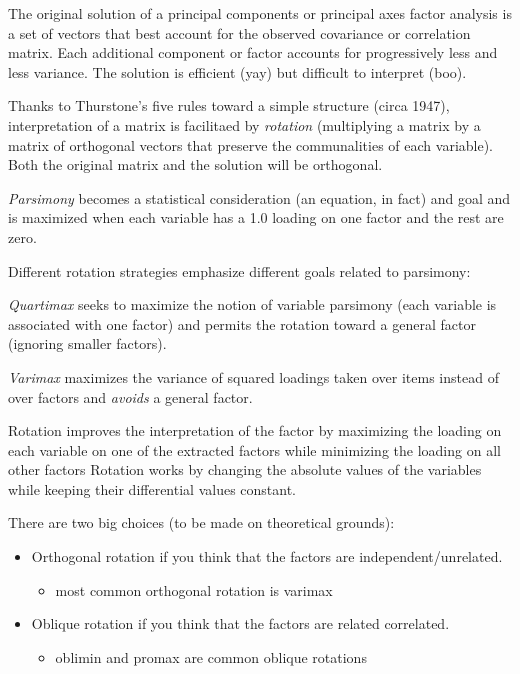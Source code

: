 \documentclass[
  english,
]{book}
\providecommand{\tightlist}{%
  \setlength{\itemsep}{0pt}\setlength{\parskip}{0pt}}
\begin{document}
The original solution of a principal components or principal axes factor analysis is a set of vectors that best account for the observed covariance or correlation matrix. Each additional component or factor accounts for progressively less and less variance. The solution is efficient (yay) but difficult to interpret (boo).

Thanks to Thurstone's five rules toward a simple structure (circa 1947), interpretation of a matrix is facilitaed by \emph{rotation} (multiplying a matrix by a matrix of orthogonal vectors that preserve the communalities of each variable). Both the original matrix and the solution will be orthogonal.

\emph{Parsimony} becomes a statistical consideration (an equation, in fact) and goal and is maximized when each variable has a 1.0 loading on one factor and the rest are zero.

Different rotation strategies emphasize different goals related to parsimony:

\emph{Quartimax} seeks to maximize the notion of variable parsimony (each variable is associated with one factor) and permits the rotation toward a general factor (ignoring smaller factors).

\emph{Varimax} maximizes the variance of squared loadings taken over items instead of over factors and \emph{avoids} a general factor.

Rotation improves the interpretation of the factor by maximizing the loading on each variable on one of the extracted factors while minimizing the loading on all other factors Rotation works by changing the absolute values of the variables while keeping their differential values constant.

There are two big choices (to be made on theoretical grounds):

\begin{itemize}
\tightlist
\item
  Orthogonal rotation if you think that the factors are independent/unrelated.

  \begin{itemize}
  \tightlist
  \item
    most common orthogonal rotation is varimax
  \end{itemize}
\item
  Oblique rotation if you think that the factors are related correlated.

  \begin{itemize}
  \tightlist
  \item
    oblimin and promax are common oblique rotations
  \end{itemize}
\end{itemize}
\end{document}
